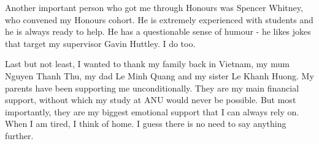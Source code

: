 Another important person who got me through Honours was Spencer Whitney, who convened my Honours cohort. He is extremely experienced with students and he is always ready to help. He has a questionable sense of humour - he likes jokes that target my supervisor Gavin Huttley. I do too. 

Last but not least, I wanted to thank my family back in Vietnam, my mum Nguyen Thanh Thu, my dad Le Minh Quang and my sister Le Khanh Huong. My parents have been supporting me unconditionally. They are my main financial support, without which my study at ANU would never be possible. But most importantly, they are my biggest emotional support that I can always rely on. When I am tired, I think of home. I guess there is no need to say anything further. 